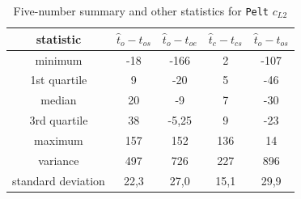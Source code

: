 \begin{table}[h]
    \begin{center}
    \begin{tabular}{|c|c|c|c|c|}
        \hline
        \textbf{statistic} & $\hat{t}_o-t_{os}$ & $\hat{t}_o-t_{oe}$ & $\hat{t}_c-t_{cs}$ & $\hat{t}_o-t_{os}$ \\ \hline
        minimum & -18 & -166 & 2 & -107 \\ \hline
        1st quartile & 9 & -20 & 5 & -46 \\ \hline
        median & 20 & -9 & 7 & -30 \\ \hline
        3rd quartile & 38 & -5,25 & 9 & -23 \\ \hline
        maximum & 157 & 152	& 136 & 14 \\ \hline
        variance & 497 & 726 & 227 & 896 \\ \hline
        standard deviation & 22,3 & 27,0 & 15,1 & 29,9 \\ \hline
    \end{tabular}
    \end{center}
    \caption{Five-number summary and other statistics for \texttt{Pelt} $c_{L2}$}
    \label{tab:statistics_pelt}
\end{table}


